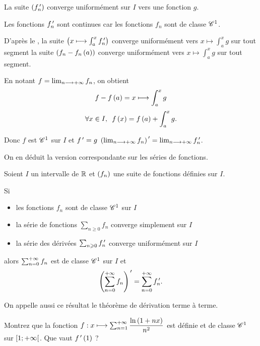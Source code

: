 \begin{dem}
La suite \(\left(f_n^{\,\prime}\right)\) converge uniformément sur \(I\) vers une fonction \(g\).

Les fonctions \(f_n^{\,\prime}\) sont continues car les fonctions \(f_n\) sont de classe \(\mathscr{C}^{1}\).

D'après le , la suite \(\left(x\longmapsto\int_a^xf_n^{\,\prime}\right)\) converge uniformément vers \(x\mapsto\int_a^xg\) sur tout segment \ie la suite \(\left(f_n-f_n\left(a\right)\right)\) converge uniformément vers \(x\mapsto\int_a^xg\) sur tout segment.

En notant \(f=\lim_{n\longrightarrow+\infty}f_n\), on obtient \[f-f\left(a\right)=x\longmapsto\int_a^xg\] \ie \[\quantifs{\forall x\in I}f\paren{x}=f\paren{a}+\int_a^xg.\]

Donc \(f\) est \(\mathscr{C}^{1}\) sur \(I\) et \(f^{\,\prime}=g\) \ie \(\left(\lim_{n\longrightarrow+\infty}f_n\right)^{\,\prime}=\lim_{n\longrightarrow+\infty}f_n^{\,\prime}\).
\end{dem}

On en déduit la version correspondante sur les séries de fonctions.

\begin{cor}
Soient \(I\) un intervalle de \(\mathbb{R}\) et \(\left(f_n\right)\) une suite de fonctions définies sur \(I\).

Si

\begin{itemize}
    \item les fonctions \(f_n\) sont de classe \(\mathscr{C}^{1}\) sur \(I\) \\
    \item la série de fonctions \(\sum_{n\geq0}f_n\) converge simplement sur \(I\) \\
    \item la série des dérivées \(\sum_{n\geqslant0}f_n^{\,\prime}\) converge uniformément sur \(I\)
\end{itemize}

alors \(\sum_{n=0}^{+\infty}f_n\) est de classe \(\mathscr{C}^{1}\) sur \(I\) et \[\left(\sum_{n=0}^{+\infty}f_n\right)^{\,\prime}=\sum_{n=0}^{+\infty}f_n^{\,\prime}.\]
\end{cor}

On appelle aussi ce résultat le théorème de dérivation terme à terme.

\begin{exo}
Montrez que la fonction \(f:x\longmapsto\sum_{n=1}^{+\infty}\dfrac{\ln\left(1+nx\right)}{n^2}\) est définie et de classe \(\mathscr{C}^{1}\) sur \(\left[1;+\infty\right[\). Que vaut \(f^{\,\prime}\left(1\right)\) ?
\end{exo}

